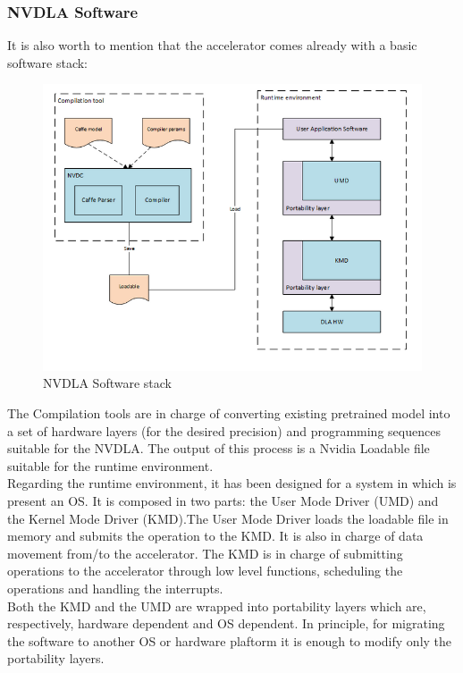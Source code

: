 \subsubsection{ NVDLA Software }
It is also worth to mention that the accelerator comes already with a basic software stack:
\begin{figure}[H]
\centering
\captionsetup{justification=centering}
\includegraphics[scale=0.8]{./figure/nvdla_software.PNG}
\caption{NVDLA Software stack\cite{WEBSITE:7}}
\label{fig:nvdlasw}
\end{figure}

The Compilation tools are in charge of converting existing pretrained model into a set of hardware layers (for the desired precision) and programming sequences suitable for the NVDLA. The output of this process is a Nvidia Loadable file suitable for the runtime environment.\\
Regarding the runtime environment, it has been designed for a system in which is present an OS. It is composed in two parts: the User Mode Driver (UMD) and the Kernel Mode Driver (KMD).\newline The User Mode Driver loads the loadable file in memory and submits the operation to the KMD. It is also in charge of data movement from/to the accelerator. \newline The KMD is in charge of submitting operations to the accelerator through low level functions, scheduling the operations and handling the interrupts.\\
Both the KMD and the UMD are wrapped into portability layers which are, respectively, hardware dependent and OS dependent. In principle, for migrating the software to another OS or hardware plaftorm it is enough to modify only the portability layers.
\newpage
